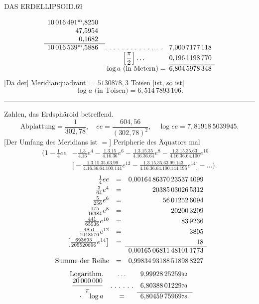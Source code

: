 \clearpage
\noindent\mbox{}\hfill DAS ERDELLIPSOID.\hfill 69\par
\[
\begin{array}{r@{\quad}c@{\quad}r}
10\,016\,491^{\mathrm m}{,}8250&&\\
47{,}5954&&\\
0{,}1682&&\\\cline{1-1}
10\,016\,539^{\mathrm m}{,}5886&\ldotp\,\ldotp\,\ldotp\,\ldotp\,\ldotp\,\ldotp\,\ldotp\,\ldotp\,\ldotp\,\ldotp\,\ldotp\,\ldotp\,\ldotp\,\ldotp&7{,}000\,7177\,118\\
&\left[\dfrac\pi2\right]\ldots&0{,}196\,1198\,770\\\cline{3-3}
\multicolumn{2}{r}{\log a\text{ (in Metern)}=}&6{,}804\,5978\,348
\end{array}
\]
[Da der] Meridianquadrant $=5130878{,}3$ Toisen [ist, so ist]
\[
\log a\text{ (in Toisen)}=6{,}514\,7893\,106.
\]
\begin{center}\rule{.25\textwidth}{.4pt}\end{center}
Zahlen, das Erdsphäroid betreffend.
\[
\text{Abplattung}=\frac1{302{,}78},\quad ee=\frac{604{,}56}{(302{,}78)^2},\quad\log ee=7{,}81918\,50399{\scriptstyle45}.
\]
[Der Umfang des Meridians ist $=$] Peripherie des Äquators mal
\[
\begin{aligned}
\bigg(1-\tfrac14ee&-\frac{1.3}{4.16}e^4-\frac{1.3.15}{4.16.36}e^6-\frac{1.3.15.35}{4.16.36.64}e^8-\frac{1.3.15.35.63}{4.16.36.64.100}e^{10}\\
&\bigg[-\frac{1.3.15.35.63.99}{4.16.36.64.100.144}e^{12}-\frac{1.3.15.35.63.99.143}{4.16.36.64.100.144.196}e^{14}\bigg]-\ldots\bigg).
\end{aligned}
\]
\[
\begin{array}{rcl}
\tfrac14ee&=&\multicolumn{1}{r}{0{,}00164\,86370\,23537\,4099}\\[3pt]
\tfrac3{64}e^4&=&\multicolumn{1}{r}{20385\,03026\,5312}\\[3pt]
\tfrac5{256}e^6&=&\multicolumn{1}{r}{56\,01252\,6094}\\[3pt]
\tfrac{175}{16384}e^8&=&\multicolumn{1}{r}{20200\,3209}\\[3pt]
\tfrac{441}{65536}e^{10}&=&\multicolumn{1}{r}{83\,9236}\\[3pt]
\tfrac{4851}{1048576}e^{12}&=&\multicolumn{1}{r}{3805}\\[3pt]
\left[\tfrac{693693}{205520896}e^{14}\right]&=&\multicolumn{1}{r}{18}\\\cline{3-3}
&&0{,}00165\,06811\,48101\,1773\\[3pt]
\text{Summe der Reihe}&=&0{,}99834\,93188\,51898\,8227
\end{array}
\]
\[
\begin{array}{rcl}
\text{Logarithm.}&\ldots&9{,}99928\,25259{\scriptstyle92}\\
\dfrac{20\,000\,000}{\pi}&\ldotp\,\ldotp\,\ldotp\,\ldotp\,\ldotp\,\ldotp&6{,}80388\,01229{\scriptstyle70}\\\cline{3-3}
\text{\raisebox{.5ex}{.}}\quad\log a&=&6{,}80459\,75969{\scriptstyle78}.
\end{array}
\]

